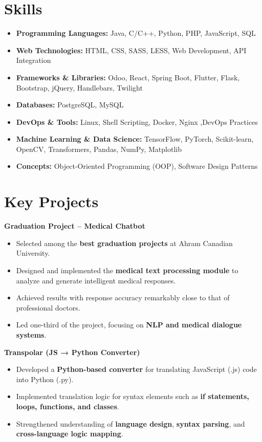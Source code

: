 \documentclass[a4paper,12pt]{article}
\begin{document}
\vspace{-1.9em}
\section*{Skills}
\vspace{-1.0em}

\begin{itemize}[nosep]
    \item \textbf{Programming Languages:} Java, C/C++, Python, PHP, JavaScript, SQL
    \item \textbf{Web Technologies:} HTML, CSS, SASS, LESS, Web Development, API Integration
    \item \textbf{Frameworks \& Libraries:} Odoo, React, Spring Boot, Flutter, Flask, Bootstrap, jQuery, Handlebars, Twilight
    \item \textbf{Databases:} PostgreSQL, MySQL
    \item \textbf{DevOps \& Tools:} Linux, Shell Scripting, Docker, Nginx ,DevOps Practices
    \item \textbf{Machine Learning \& Data Science:} TensorFlow, PyTorch, Scikit-learn, OpenCV, Transformers, Pandas, NumPy, Matplotlib
    \item \textbf{Concepts:} Object-Oriented Programming (OOP), Software Design Patterns
\end{itemize}

\vspace{-1.9em}
\section*{Key Projects}
\vspace{-1.0em}
\noindent\textbf{Graduation Project – Medical Chatbot}\\[-1.2em]
\begin{itemize}[nosep]
    \item Selected among the \textbf{best graduation projects} at Ahram Canadian University.
    \item Designed and implemented the \textbf{medical text processing module} to analyze and generate intelligent medical responses.
    \item Achieved results with response accuracy remarkably close to that of professional doctors.
    \item Led one-third of the project, focusing on \textbf{NLP and medical dialogue systems}.
\end{itemize}

\vspace{0.5em}
\noindent\textbf{Transpolar (JS → Python Converter)}\\[-1.2em]
\begin{itemize}[nosep]
    \item Developed a \textbf{Python-based converter} for translating JavaScript (.js) code into Python (.py).
    \item Implemented translation logic for syntax elements such as \textbf{if statements, loops, functions, and classes}.
    \item Strengthened understanding of \textbf{language design}, \textbf{syntax parsing}, and \textbf{cross-language logic mapping}.
\end{itemize}
\end{document}
